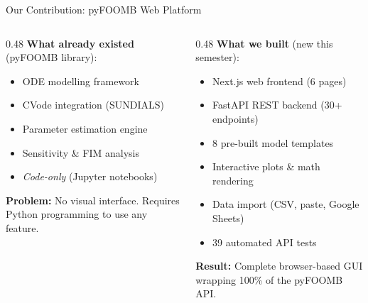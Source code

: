 \documentclass[aspectratio=169, 11pt]{beamer}
\begin{document}
\begin{frame}{Our Contribution: pyFOOMB Web Platform}
  \begin{columns}[T]
    \begin{column}{0.48\textwidth}
      \textbf{What already existed} {\small(pyFOOMB library):}
      \begin{itemize}
        \item[\textcolor{accentblue}{$\bullet$}] ODE modelling framework
        \item[\textcolor{accentblue}{$\bullet$}] CVode integration (SUNDIALS)
        \item[\textcolor{accentblue}{$\bullet$}] Parameter estimation engine
        \item[\textcolor{accentblue}{$\bullet$}] Sensitivity \& FIM analysis
        \item[\textcolor{accentblue}{$\bullet$}] \textit{Code-only} (Jupyter notebooks)
      \end{itemize}

      \vspace{0.2cm}
      \textbf{Problem:} No visual interface. Requires
      Python programming to use any feature.
    \end{column}
    \begin{column}{0.48\textwidth}
      \textbf{What we built} {\small(new this semester):}
      \begin{itemize}
        \item[\textcolor{donegreen}{\checkmark}] Next.js web frontend (6 pages)
        \item[\textcolor{donegreen}{\checkmark}] FastAPI REST backend (30+ endpoints)
        \item[\textcolor{donegreen}{\checkmark}] 8 pre-built model templates
        \item[\textcolor{donegreen}{\checkmark}] Interactive plots \& math rendering
        \item[\textcolor{donegreen}{\checkmark}] Data import (CSV, paste, Google Sheets)
        \item[\textcolor{donegreen}{\checkmark}] 39 automated API tests
      \end{itemize}

      \vspace{0.2cm}
      \textbf{Result:} Complete browser-based GUI
      wrapping 100\% of the pyFOOMB API.
    \end{column}
  \end{columns}
\end{frame}
\end{document}
